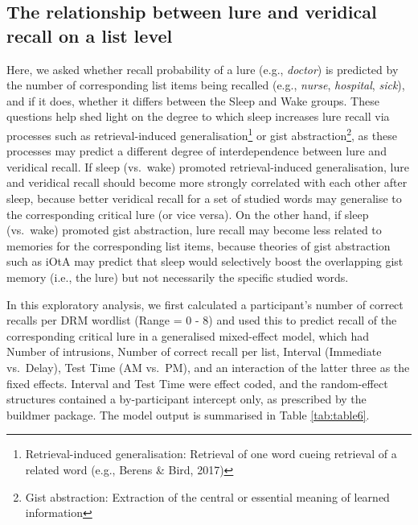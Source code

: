 \documentclass[
]{article}
\begin{document}
\hypertarget{the-relationship-between-lure-and-veridical-recall-on-a-list-level}{%
\subsection{The relationship between lure and veridical recall on a list level}\label{the-relationship-between-lure-and-veridical-recall-on-a-list-level}}

Here, we asked whether recall probability of a lure (e.g., \emph{doctor}) is predicted by the number of corresponding list items being recalled (e.g., \emph{nurse}, \emph{hospital}, \emph{sick}), and if it does, whether it differs between the Sleep and Wake groups. These questions help shed light on the degree to which sleep increases lure recall via processes such as retrieval-induced generalisation\footnote{Retrieval-induced generalisation: Retrieval of one word cueing retrieval of a related word (e.g., Berens \& Bird, 2017)} or gist abstraction\footnote{Gist abstraction: Extraction of the central or essential meaning of learned information}, as these processes may predict a different degree of interdependence between lure and veridical recall. If sleep (vs.~wake) promoted retrieval-induced generalisation, lure and veridical recall should become more strongly correlated with each other after sleep, because better veridical recall for a set of studied words may generalise to the corresponding critical lure (or vice versa). On the other hand, if sleep (vs.~wake) promoted gist abstraction, lure recall may become less related to memories for the corresponding list items, because theories of gist abstraction such as iOtA may predict that sleep would selectively boost the overlapping gist memory (i.e., the lure) but not necessarily the specific studied words.

In this exploratory analysis, we first calculated a participant's number of correct recalls per DRM wordlist (Range = 0 - 8) and used this to predict recall of the corresponding critical lure in a generalised mixed-effect model, which had Number of intrusions, Number of correct recall per list, Interval (Immediate vs.~Delay), Test Time (AM vs.~PM), and an interaction of the latter three as the fixed effects. Interval and Test Time were effect coded, and the random-effect structures contained a by-participant intercept only, as prescribed by the buildmer package. The model output is summarised in Table \ref{tab:table6}.
\end{document}
